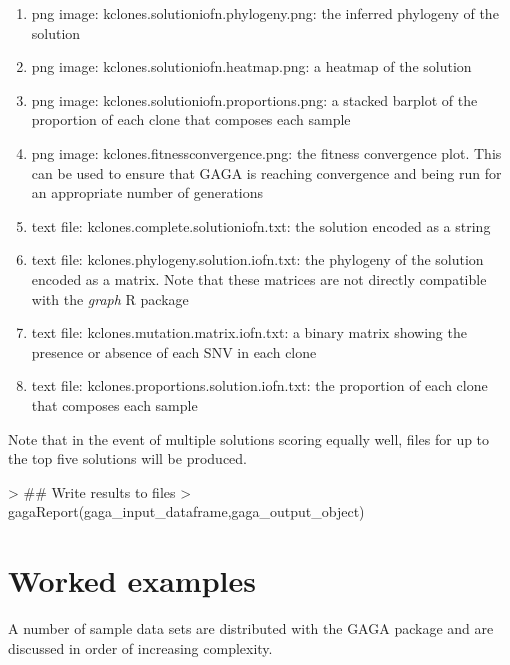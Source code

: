 \documentclass{article}
\begin{document}
\begin{enumerate}
   \item png image: {\color{icrred}k}clones.solution{\color{icrred}i}of{\color{icrred}n}.phylogeny.png: the inferred phylogeny of the solution 
   \item png image: {\color{icrred}k}clones.solution{\color{icrred}i}of{\color{icrred}n}.heatmap.png: a heatmap of the solution
   \item png image: {\color{icrred}k}clones.solution{\color{icrred}i}of{\color{icrred}n}.proportions.png: a stacked barplot of the proportion of each clone that composes each sample
   \item png image: {\color{icrred}k}clones.fitnessconvergence.png: the fitness convergence plot.  This can be used to ensure that GAGA is reaching convergence and being run for an appropriate number of generations
   \item text file: {\color{icrred}k}clones.complete.solution{\color{icrred}i}of{\color{icrred}n}.txt: the solution encoded as a string
   \item text file: {\color{icrred}k}clones.phylogeny.solution.{\color{icrred}i}of{\color{icrred}n}.txt: the phylogeny of the solution
   encoded as a matrix.  Note that these matrices are not directly compatible with the \emph{graph} R package
   \item text file: {\color{icrred}k}clones.mutation.matrix.{\color{icrred}i}of{\color{icrred}n}.txt: a binary matrix showing the
   presence or absence of each SNV in each clone
   \item text file: {\color{icrred}k}clones.proportions.solution.{\color{icrred}i}of{\color{icrred}n}.txt: the proportion of each 
   clone that composes each sample
\end{enumerate}

Note that in the event of multiple solutions scoring equally well, files for up to the top five solutions will be produced.

\begin{Schunk}
\begin{Sinput}
> ## Write results to files
> gagaReport(gaga_input_dataframe,gaga_output_object)
\end{Sinput}
\end{Schunk}


\section{Worked examples}
A number of sample data sets are distributed with the GAGA package and are discussed in order of increasing complexity.
\end{document}
